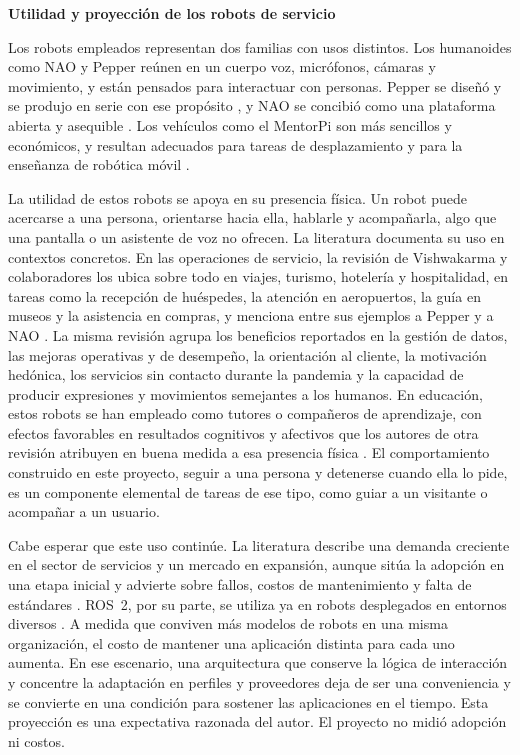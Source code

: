 \documentclass[11pt,letterpaper]{article}
\begin{document}
\par\medskip\noindent\textbf{Utilidad y proyección de los robots de servicio}\par

Los robots empleados representan dos familias con usos distintos. Los humanoides como NAO y Pepper reúnen en un cuerpo voz, micrófonos, cámaras y movimiento, y están pensados para interactuar con personas. Pepper se diseñó y se produjo en serie con ese propósito \cite{pepper}, y NAO se concibió como una plataforma abierta y asequible \cite{nao}. Los vehículos como el MentorPi son más sencillos y económicos, y resultan adecuados para tareas de desplazamiento y para la enseñanza de robótica móvil \cite{mentorpi}.

La utilidad de estos robots se apoya en su presencia física. Un robot puede acercarse a una persona, orientarse hacia ella, hablarle y acompañarla, algo que una pantalla o un asistente de voz no ofrecen. La literatura documenta su uso en contextos concretos. En las operaciones de servicio, la revisión de Vishwakarma y colaboradores los ubica sobre todo en viajes, turismo, hotelería y hospitalidad, en tareas como la recepción de huéspedes, la atención en aeropuertos, la guía en museos y la asistencia en compras, y menciona entre sus ejemplos a Pepper y a NAO \cite{socialrobots}. La misma revisión agrupa los beneficios reportados en la gestión de datos, las mejoras operativas y de desempeño, la orientación al cliente, la motivación hedónica, los servicios sin contacto durante la pandemia y la capacidad de producir expresiones y movimientos semejantes a los humanos. En educación, estos robots se han empleado como tutores o compañeros de aprendizaje, con efectos favorables en resultados cognitivos y afectivos que los autores de otra revisión atribuyen en buena medida a esa presencia física \cite{belpaeme}. El comportamiento construido en este proyecto, seguir a una persona y detenerse cuando ella lo pide, es un componente elemental de tareas de ese tipo, como guiar a un visitante o acompañar a un usuario.

Cabe esperar que este uso continúe. La literatura describe una demanda creciente en el sector de servicios y un mercado en expansión, aunque sitúa la adopción en una etapa inicial y advierte sobre fallos, costos de mantenimiento y falta de estándares \cite{socialrobots}. ROS~2, por su parte, se utiliza ya en robots desplegados en entornos diversos \cite{ros2}. A medida que conviven más modelos de robots en una misma organización, el costo de mantener una aplicación distinta para cada uno aumenta. En ese escenario, una arquitectura que conserve la lógica de interacción y concentre la adaptación en perfiles y proveedores deja de ser una conveniencia y se convierte en una condición para sostener las aplicaciones en el tiempo. Esta proyección es una expectativa razonada del autor. El proyecto no midió adopción ni costos.
\end{document}
